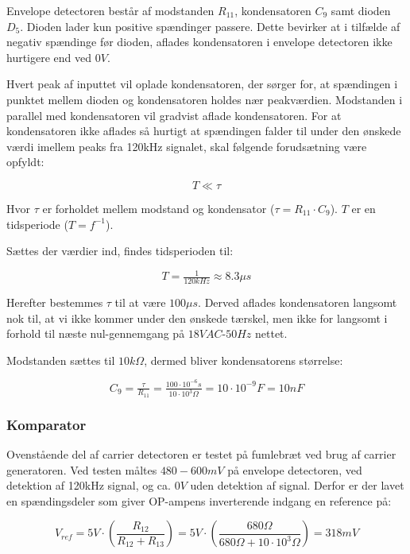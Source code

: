 Envelope detectoren består af modstanden $R_{11}$, kondensatoren $C_{9}$ samt dioden $D_{5}$. Dioden lader kun positive spændinger passere. Dette bevirker at i tilfælde af negativ spændinge før dioden, aflades kondensatoren i envelope detectoren ikke hurtigere end ved $0V$.

Hvert peak af inputtet vil oplade kondensatoren, der sørger for, at spændingen i punktet mellem dioden og kondensatoren holdes nær peakværdien. Modstanden i parallel med kondensatoren vil gradvist aflade kondensatoren. For at kondensatoren ikke aflades så hurtigt at spændingen falder til under den ønskede værdi imellem peaks fra 120kHz signalet, skal følgende forudsætning være opfyldt:

\begin{displaymath}
T \ll \tau
\end{displaymath}

Hvor $\tau$ er forholdet mellem modstand og kondensator ($\tau = R_{11} \cdot C_{9}$). $T$ er en tidsperiode ($T = f^{-1}$).

Sættes der værdier ind, findes tidsperioden til:

\begin{displaymath}
T = \tfrac{1}{120kHz} \approx 8.3 \mu s 
\end{displaymath}

Herefter bestemmes $\tau$ til at være $100 \mu s$. Derved aflades kondensatoren langsomt nok til, at vi ikke kommer under den ønskede tærskel, men ikke for langsomt i forhold til næste nul-gennemgang på $18VAC$-$50Hz$ nettet.

Modstanden sættes til $10k\Omega$, dermed bliver kondensatorens størrelse:

\begin{displaymath}
C_{9} = \tfrac{\tau}{R_{11}} = \tfrac{100\cdot 10^{-6}s}{10 \cdot 10^{3}\Omega} = 10 \cdot 10^{-9}F = 10 nF
\end{displaymath}

\subsubsection{Komparator}
Ovenstående del af carrier detectoren er testet på fumlebræt ved brug af carrier generatoren. Ved testen måltes $480-600mV$ på envelope detectoren, ved detektion af 120kHz signal, og ca. $0V$ uden detektion af signal. Derfor er der lavet en spændingsdeler som giver OP-ampens\cite{lib:TS912} inverterende indgang en reference på:

\begin{displaymath}
V_{ref}= 5V \cdot \left(\dfrac{R_{12}}{R_{12}+R_{13}}\right)=5V \cdot \left(\dfrac{680\Omega}{680\Omega + 10 \cdot 10^{3}\Omega}\right)=318mV
\end{displaymath}

